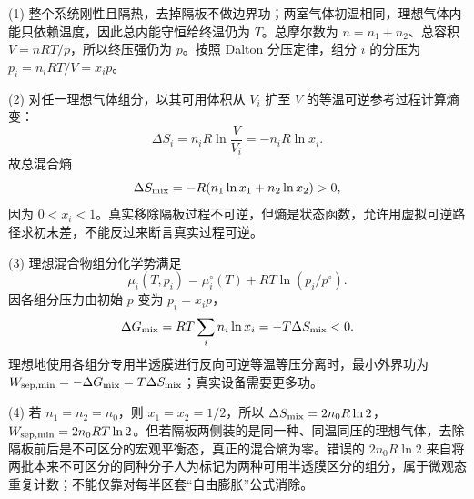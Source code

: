 (1) 整个系统刚性且隔热，去掉隔板不做边界功；两室气体初温相同，理想气体内能只依赖温度，因此总内能守恒给终温仍为 \(T\)。总摩尔数为 \(n=n_1+n_2\)、总容积 \(V=nRT/p\)，所以终压强仍为 \(p\)。按照 Dalton 分压定律，组分 \(i\) 的分压为 \(p_i=n_iRT/V=x_i p\)。

(2) 对任一理想气体组分，以其可用体积从 \(V_i\) 扩至 \(V\) 的等温可逆参考过程计算熵变：
\[
\Delta S_i=n_iR\ln\frac V{V_i}=-n_iR\ln x_i.
\]
故总混合熵
\[
\Delta S_{\rm mix}=-R(n_1\ln x_1+n_2\ln x_2)>0,
\]
因为 \(0<x_i<1\)。真实移除隔板过程不可逆，但熵是状态函数，允许用虚拟可逆路径求初末差，不能反过来断言真实过程可逆。

(3) 理想混合物组分化学势满足
\[
\mu_i(T,p_i)=\mu_i^\circ(T)+RT\ln(p_i/p^\circ).
\]
因各组分压力由初始 \(p\) 变为 \(p_i=x_ip\)，
\[
\Delta G_{\rm mix}=RT\sum_i n_i\ln x_i=-T\Delta S_{\rm mix}<0.
\]
理想地使用各组分专用半透膜进行反向可逆等温等压分离时，最小外界功为 \(W_{\rm sep,min}=-\Delta G_{\rm mix}=T\Delta S_{\rm mix}\)；真实设备需要更多功。

(4) 若 \(n_1=n_2=n_0\)，则 \(x_1=x_2=1/2\)，所以 \(\Delta S_{\rm mix}=2n_0R\ln2\)，\(W_{\rm sep,min}=2n_0RT\ln2\)。但若隔板两侧装的是同一种、同温同压的理想气体，去除隔板前后是不可区分的宏观平衡态，真正的混合熵为零。错误的 \(2n_0R\ln2\) 来自将两批本来不可区分的同种分子人为标记为两种可用半透膜区分的组分，属于微观态重复计数；不能仅靠对每半区套“自由膨胀”公式消除。
